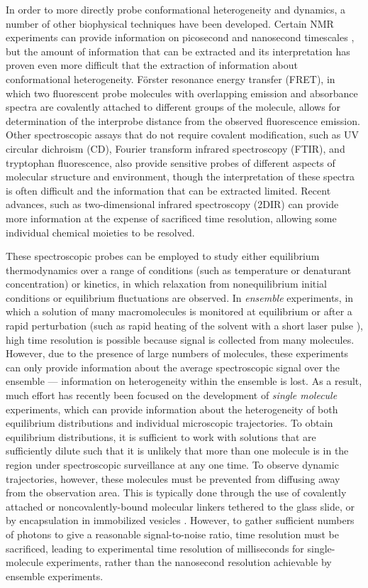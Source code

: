 In order to more directly probe conformational heterogeneity and dynamics, a number of other biophysical techniques have been developed.
Certain NMR experiments can provide information on picosecond and nanosecond timescales \cite{wand:chem-rev:2006}, but the amount of information that can be extracted and its interpretation has proven even more difficult that the extraction of information about conformational heterogeneity.
F\"{o}rster resonance energy transfer (FRET), in which two fluorescent probe molecules with overlapping emission and absorbance spectra are covalently attached to different groups of the molecule, allows for determination of the interprobe distance from the observed fluorescence emission.
Other spectroscopic assays that do not require covalent modification, such as UV circular dichroism (CD), Fourier transform infrared spectroscopy (FTIR), and tryptophan fluorescence, also provide sensitive probes of different aspects of molecular structure and environment, though the interpretation of these spectra is often difficult and the information that can be extracted limited.
Recent advances, such as two-dimensional infrared spectroscopy (2DIR) \cite{khalil:2003a} can provide more information at the expense of sacrificed time resolution, allowing some individual chemical moieties to be resolved.

These spectroscopic probes can be employed to study either equilibrium thermodynamics over a range of conditions (such as temperature or denaturant concentration) or kinetics, in which relaxation from nonequilibrium initial conditions or equilibrium fluctuations are observed.
In \emph{ensemble} experiments, in which a solution of many macromolecules is monitored at equilibrium or after a rapid perturbation (such as rapid heating of the solvent with a short laser pulse \cite{gruebele:1998a}), high time resolution is possible because signal is collected from many molecules.
However, due to the presence of large numbers of molecules, these experiments can only provide information about the average spectroscopic signal over the ensemble --- information on heterogeneity within the ensemble is lost.
As a result, much effort has recently been focused on the development of \emph{single molecule} experiments, which can provide information about the heterogeneity of both equilibrium distributions and individual microscopic trajectories.
To obtain equilibrium distributions, it is sufficient to work with solutions that are sufficiently dilute such that it is unlikely that more than one molecule is in the region under spectroscopic surveillance at any one time.
To observe dynamic trajectories, however, these molecules must be prevented from diffusing away from the observation area.
This is typically done through the use of covalently attached or noncovalently-bound molecular linkers tethered to the glass slide, or by encapsulation in immobilized vesicles \cite{rhoades:2004a}.
However, to gather sufficient numbers of photons to give a reasonable signal-to-noise ratio, time resolution must be sacrificed, leading to experimental time resolution of milliseconds for single-molecule experiments, rather than the nanosecond resolution achievable by ensemble experiments.

